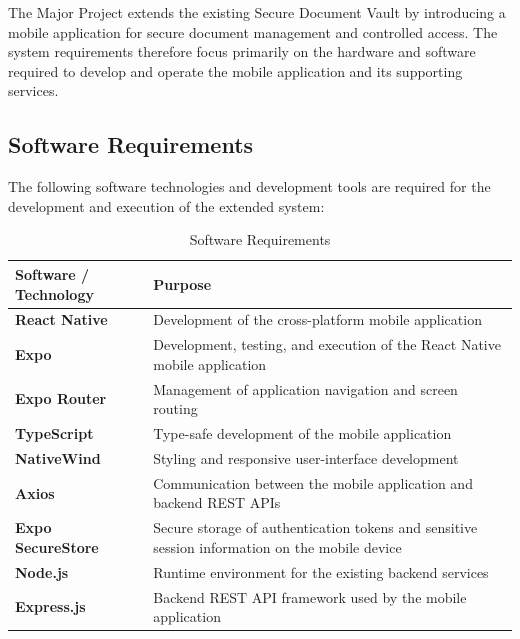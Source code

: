 \documentclass[12pt]{article}
\begin{document}
The Major Project extends the existing Secure Document Vault by introducing a mobile application for secure document management and controlled access. The system requirements therefore focus primarily on the hardware and software required to develop and operate the mobile application and its supporting services.

\subsection{Software Requirements}

The following software technologies and development tools are required for the development and execution of the extended system:

\begin{table}[h]
\centering
\caption{Software Requirements}
\label{tab:software_requirements}
\renewcommand{\arraystretch}{1.3}
\begin{tabular}{|p{4cm}|p{9cm}|}
\hline
\textbf{Software / Technology} & \textbf{Purpose} \\ \hline

\textbf{React Native} & Development of the cross-platform mobile application \\ \hline

\textbf{Expo} & Development, testing, and execution of the React Native mobile application \\ \hline

\textbf{Expo Router} & Management of application navigation and screen routing \\ \hline

\textbf{TypeScript} & Type-safe development of the mobile application \\ \hline

\textbf{NativeWind} & Styling and responsive user-interface development \\ \hline

\textbf{Axios} & Communication between the mobile application and backend REST APIs \\ \hline

\textbf{Expo SecureStore} & Secure storage of authentication tokens and sensitive session information on the mobile device \\ \hline

\textbf{Node.js} & Runtime environment for the existing backend services \\ \hline

\textbf{Express.js} & Backend REST API framework used by the mobile application \\ \hline


\end{tabular}
\end{table}
\end{document}

